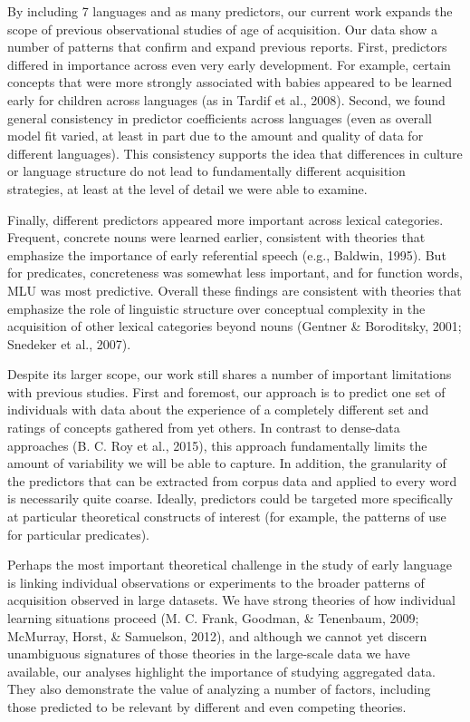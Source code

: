 \documentclass[10pt, letterpaper]{article}
\begin{document}
By including 7 languages and as many predictors, our current work
expands the scope of previous observational studies of age of
acquisition. Our data show a number of patterns that confirm and expand
previous reports. First, predictors differed in importance across even
very early development. For example, certain concepts that were more
strongly associated with babies appeared to be learned early for
children across languages (as in Tardif et al., 2008). Second, we found
general consistency in predictor coefficients across languages (even as
overall model fit varied, at least in part due to the amount and quality
of data for different languages). This consistency supports the idea
that differences in culture or language structure do not lead to
fundamentally different acquisition strategies, at least at the level of
detail we were able to examine.

Finally, different predictors appeared more important across lexical
categories. Frequent, concrete nouns were learned earlier, consistent
with theories that emphasize the importance of early referential speech
(e.g., Baldwin, 1995). But for predicates, concreteness was somewhat
less important, and for function words, MLU was most predictive. Overall
these findings are consistent with theories that emphasize the role of
linguistic structure over conceptual complexity in the acquisition of
other lexical categories beyond nouns (Gentner \& Boroditsky, 2001;
Snedeker et al., 2007).

Despite its larger scope, our work still shares a number of important
limitations with previous studies. First and foremost, our approach is
to predict one set of individuals with data about the experience of a
completely different set and ratings of concepts gathered from yet
others. In contrast to dense-data approaches (B. C. Roy et al., 2015),
this approach fundamentally limits the amount of variability we will be
able to capture. In addition, the granularity of the predictors that can
be extracted from corpus data and applied to every word is necessarily
quite coarse. Ideally, predictors could be targeted more specifically at
particular theoretical constructs of interest (for example, the patterns
of use for particular predicates).

Perhaps the most important theoretical challenge in the study of early
language is linking individual observations or experiments to the
broader patterns of acquisition observed in large datasets. We have
strong theories of how individual learning situations proceed (M. C.
Frank, Goodman, \& Tenenbaum, 2009; McMurray, Horst, \& Samuelson,
2012), and although we cannot yet discern unambiguous signatures of
those theories in the large-scale data we have available, our analyses
highlight the importance of studying aggregated data. They also
demonstrate the value of analyzing a number of factors, including those
predicted to be relevant by different and even competing theories.
\end{document}

